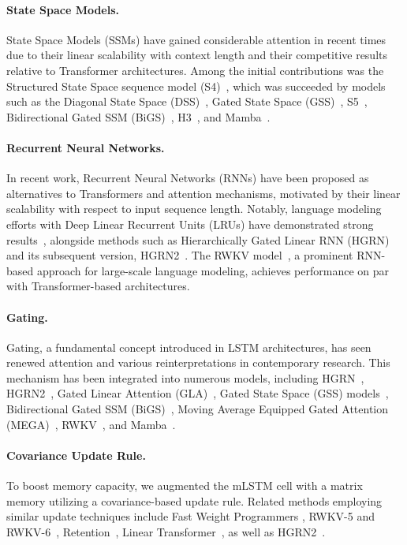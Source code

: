 \paragraph{State Space Models.} State Space Models (SSMs) have gained considerable attention in recent times due to their linear scalability with context length and their competitive results relative to Transformer architectures. Among the initial contributions was the Structured State Space sequence model (S4)~\citep{Gu:21}, which was succeeded by models such as the Diagonal State Space (DSS)~\citep{Gupta:22}, Gated State Space (GSS)~\citep{Mehta:22}, S5~\citep{Smith:22}, Bidirectional Gated SSM (BiGS)~\citep{Wang:22}, H3~\citep{Fu:23}, and Mamba~\citep{Gu:24arxiv}.

\paragraph{Recurrent Neural Networks.} In recent work, Recurrent Neural Networks (RNNs) have been proposed as alternatives to Transformers and attention mechanisms, motivated by their linear scalability with respect to input sequence length. Notably, language modeling efforts with Deep Linear Recurrent Units (LRUs) have demonstrated strong results~\citep{Orvieto:23, De:24arxiv}, alongside methods such as Hierarchically Gated Linear RNN (HGRN)~\citep{Qin:23} and its subsequent version, HGRN2~\citep{Qin:24arxiv}. The RWKV model~\citep{Peng:23arxivshort,Peng:24arxivshort}, a prominent RNN-based approach for large-scale language modeling, achieves performance on par with Transformer-based architectures.

\paragraph{Gating.}
Gating, a fundamental concept introduced in LSTM architectures, has seen renewed attention and various reinterpretations in contemporary research. This mechanism has been integrated into numerous models, including HGRN~\citep{Qin:23}, HGRN2~\citep{Qin:24arxiv}, Gated Linear Attention (GLA)~\citep{Yang:23arxiv}, Gated State Space (GSS) models~\citep{Mehta:22}, Bidirectional Gated SSM (BiGS)~\citep{Wang:22}, Moving Average Equipped Gated Attention (MEGA)~\citep{Ma:22}, RWKV~\citep{Peng:23arxivshort}, and Mamba~\citep{Gu:24arxiv}.

\paragraph{Covariance Update Rule.}  
To boost memory capacity, we augmented the mLSTM cell with a matrix memory utilizing a covariance-based update rule. Related methods employing similar update techniques include Fast Weight Programmers \citep{Schmidhuber:92ncfastweights,Schlag:21}, RWKV-5 and RWKV-6~\citep{Peng:24arxivshort}, Retention~\citep{Sun:23arxiv}, Linear Transformer~\citep{Katharopoulos:20}, as well as HGRN2~\citep{Qin:24arxiv}.

